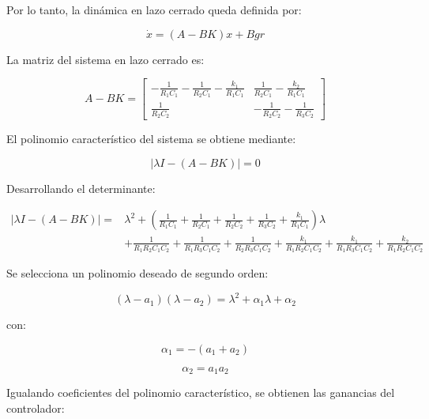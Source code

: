 \documentclass[12pt,letterpaper,twoside]{article}
\begin{document}
Por lo tanto, la dinámica en lazo cerrado queda definida por:

\begin{equation}
\dot{x} = (A-BK)x + Bgr
\end{equation}

La matriz del sistema en lazo cerrado es:

\begin{equation}
A-BK =
\begin{bmatrix}
-\frac{1}{R_1C_1}-\frac{1}{R_2C_1}-\frac{k_1}{R_1C_1} &
\frac{1}{R_2C_1}-\frac{k_2}{R_1C_1}\\[10pt]
\frac{1}{R_2C_2} &
-\frac{1}{R_2C_2}-\frac{1}{R_3C_2}
\end{bmatrix}
\end{equation}

El polinomio característico del sistema se obtiene mediante:

\begin{equation}
\left| \lambda I - (A-BK) \right| = 0
\end{equation}

Desarrollando el determinante:

\begin{equation}
\begin{aligned}
\left| \lambda I - (A-BK) \right|
=
&\lambda^2
+\left(
\frac{1}{R_1C_1}
+\frac{1}{R_2C_1}
+\frac{1}{R_2C_2}
+\frac{1}{R_3C_2}
+\frac{k_1}{R_1C_1}
\right)\lambda \\
&+
\frac{1}{R_1R_2C_1C_2}
+
\frac{1}{R_1R_3C_1C_2}
+
\frac{1}{R_2R_3C_1C_2}
+
\frac{k_1}{R_1R_2C_1C_2}
+
\frac{k_1}{R_1R_3C_1C_2}
+
\frac{k_2}{R_1R_2C_1C_2}
\end{aligned}
\end{equation}

Se selecciona un polinomio deseado de segundo orden:

\begin{equation}
(\lambda-a_1)(\lambda-a_2)
=
\lambda^2 + \alpha_1\lambda + \alpha_2
\end{equation}

con:

\begin{equation}
\alpha_1 = -(a_1+a_2)
\end{equation}

\begin{equation}
\alpha_2 = a_1a_2
\end{equation}

Igualando coeficientes del polinomio característico, se obtienen las ganancias del controlador:
\end{document}
